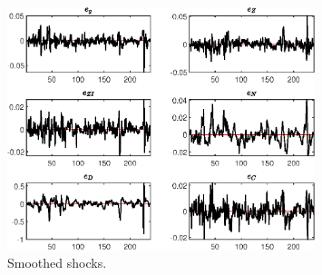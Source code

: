  
\begin{figure}[H]
\centering 
\includegraphics[width=0.80\textwidth]{BRS_imp_mobility_est/graphs/BRS_imp_mobility_est_SmoothedShocks1}
\caption{Smoothed shocks.}\label{Fig:SmoothedShocks:1}
\end{figure}


